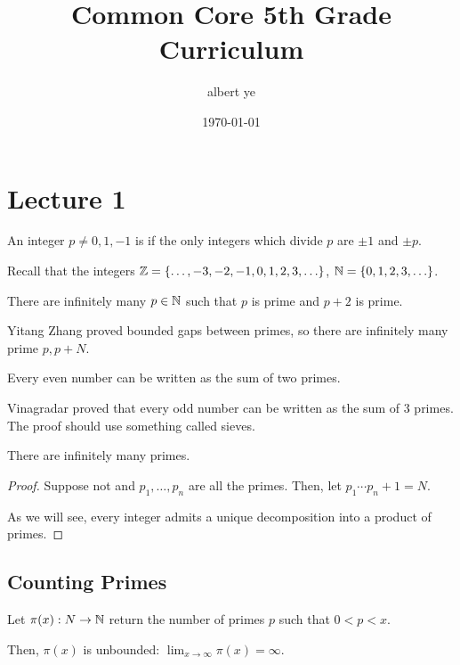 \documentclass{article}
\title{Common Core 5th Grade Curriculum}
\author{albert ye}
\date{\today}
\begin{document}
\maketitle

\section{Lecture 1}
\begin{definition}
    An integer $p \neq 0, 1, -1$ is  if the only integers which divide $p$ are $\pm 1$ and $\pm p$.
\end{definition}

Recall that the integers $\mathbb Z = \{\ldots, -3, -2, -1, 0, 1, 2, 3, \ldots\}$, $\mathbb N = \{0, 1, 2, 3, \ldots\}$.

\begin{theorem}
    There are infinitely many $p \in \mathbb N$ such that $p$ is prime and $p + 2$ is prime.
\end{theorem}

Yitang Zhang proved bounded gaps between primes, so there are infinitely many prime $p, p + N$.

\begin{theorem}
    Every even number can be written as the sum of two primes.
\end{theorem}

Vinagradar proved that every odd number can be written as the sum of $3$ primes. The proof should use something called sieves.

\begin{proposition}
    There are infinitely many primes.
\end{proposition}

\begin{proof}
    Suppose not and $p_1, \ldots, p_n$ are all the primes. Then, let $p_1\cdots p_n + 1 = N$. 
    
    As we will see, every integer admits a unique decomposition into a product of primes.
\end{proof}

\subsection{Counting Primes}
Let $\pi(x) : N \to \mathbb N$ return the number of primes $p$ such that $0 < p < x$.

Then, $\pi(x)$ is unbounded: $\lim_{x \to \infty} \pi(x) = \infty$. 
\end{document}
